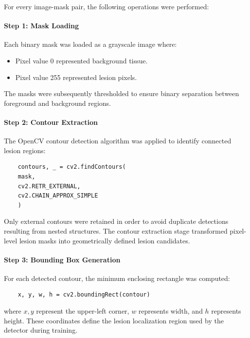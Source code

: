 For every image-mask pair, the following operations were performed:

\paragraph{Step 1: Mask Loading}
Each binary mask was loaded as a grayscale image where:
\begin{itemize}
	\item Pixel value 0 represented background tissue.
	\item Pixel value 255 represented lesion pixels.
\end{itemize}
The masks were subsequently thresholded to ensure binary separation between foreground and background regions.

\paragraph{Step 2: Contour Extraction}
The OpenCV contour detection algorithm was applied to identify connected lesion regions:
\begin{verbatim}
	contours, _ = cv2.findContours(
	mask,
	cv2.RETR_EXTERNAL,
	cv2.CHAIN_APPROX_SIMPLE
	)
\end{verbatim}
Only external contours were retained in order to avoid duplicate detections resulting from nested structures. The contour extraction stage transformed pixel-level lesion masks into geometrically defined lesion candidates.

\paragraph{Step 3: Bounding Box Generation}
For each detected contour, the minimum enclosing rectangle was computed:
\begin{verbatim}
	x, y, w, h = cv2.boundingRect(contour)
\end{verbatim}
where $x, y$ represent the upper-left corner, $w$ represents width, and $h$ represents height. These coordinates define the lesion localization region used by the detector during training.

